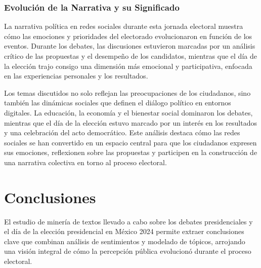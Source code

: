 \documentclass[10pt, a4paper]{article}
\begin{document}
	\subsubsection{Evolución de la Narrativa y su Significado}
	
	La narrativa política en redes sociales durante esta jornada electoral muestra cómo las emociones y prioridades del electorado evolucionaron en función de los eventos. Durante los debates, las discusiones estuvieron marcadas por un análisis crítico de las propuestas y el desempeño de los candidatos, mientras que el día de la elección trajo consigo una dimensión más emocional y participativa, enfocada en las experiencias personales y los resultados.
	
	Los temas discutidos no solo reflejan las preocupaciones de los ciudadanos, sino también las dinámicas sociales que definen el diálogo político en entornos digitales. La educación, la economía y el bienestar social dominaron los debates, mientras que el día de la elección estuvo marcado por un interés en los resultados y una celebración del acto democrático. Este análisis destaca cómo las redes sociales se han convertido en un espacio central para que los ciudadanos expresen sus emociones, reflexionen sobre las propuestas y participen en la construcción de una narrativa colectiva en torno al proceso electoral.
	
	
	
	\section{Conclusiones}
	
	El estudio de minería de textos llevado a cabo sobre los debates presidenciales y el día de la elección presidencial en México 2024 permite extraer conclusiones clave que combinan análisis de sentimientos y modelado de tópicos, arrojando una visión integral de cómo la percepción pública evolucionó durante el proceso electoral.
	
\end{document}

